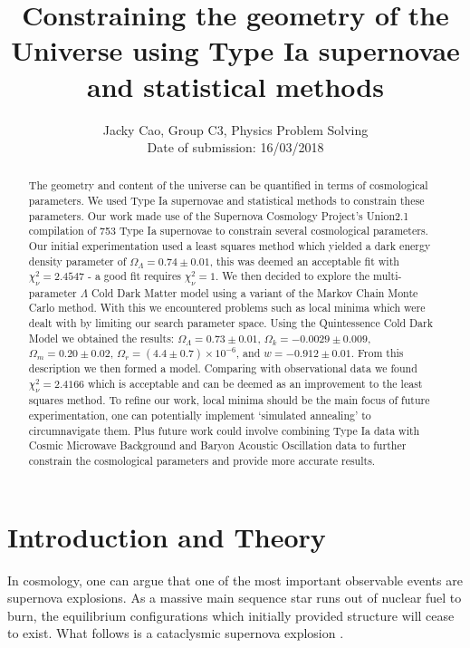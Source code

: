 \documentclass[twocolumn]{revtex4}
\begin{document}
\textheight=26.385cm

\title{Constraining the geometry of the Universe using Type Ia supernovae and statistical methods}
 
\author{Jacky Cao, Group C3, Physics Problem Solving \\ Date of submission: 16/03/2018}

\begin{abstract}     
The geometry and content of the universe can be quantified in terms of cosmological parameters. We used Type Ia supernovae and statistical methods to constrain these parameters. Our work made use of the Supernova Cosmology Project's Union2.1 compilation of 753 Type Ia supernovae to constrain several cosmological parameters. Our initial experimentation used a least squares method which yielded a dark energy density parameter of $\Omega_\Lambda=0.74\pm0.01$, this was deemed an acceptable fit with $\chi^2_\nu=2.4547$ - a good fit requires $\chi^2_\nu=1$. We then decided to explore the multi-parameter $\Lambda$ Cold Dark Matter model using a variant of the Markov Chain Monte Carlo method. With this we encountered problems such as local minima which were dealt with by limiting our search parameter space. Using the Quintessence Cold Dark Model we obtained the results: $\Omega_\Lambda=0.73\pm0.01$, $\Omega_k=-0.0029\pm0.009$, $\Omega_m = 0.20\pm0.02$, $\Omega_r = (4.4\pm0.7)\times10^{-6}$, and $w=-0.912\pm0.01$. From this description we then formed a model. Comparing with observational data we found $\chi^2_\nu=2.4166$ which is acceptable and can be deemed as an improvement to the least squares method. To refine our work, local minima should be the main focus of future experimentation, one can potentially implement `simulated annealing' to circumnavigate them. Plus future work could involve combining Type Ia data with Cosmic Microwave Background and Baryon Acoustic Oscillation data to further constrain the cosmological parameters and provide more accurate results.
\end{abstract}

\maketitle

\vspace{-3ex}
\section{Introduction and Theory} 
\vspace{-2ex}
In cosmology, one can argue that one of the most important observable events are supernova explosions. As a massive main sequence star runs out of nuclear fuel to burn, the equilibrium configurations which initially provided structure will cease to exist. What follows is a cataclysmic supernova explosion \cite{longair}. 
\end{document}

